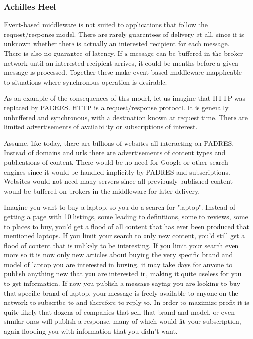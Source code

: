 \documentclass{acm_proc_article-sp}
\begin{document}

\subsubsection{Achilles Heel}
\label{sec:appsebbad}


Event-based middleware is not suited to applications that follow the request/response model. There are rarely guarantees of delivery  at all, since it is unknown whether there is actually an interested recipient for each message. There is also no guarantee of latency. If a message can be buffered in the broker network until an interested recipient arrives, it could be months before a given message is processed. Together these make event-based middleware inapplicable to situations where synchronous operation is desirable.

As an example of the consequences of this model, let us imagine that HTTP was replaced by PADRES. HTTP is a request/response protocol. It is generally unbuffered and synchronous, with a destination known at request time. There are limited advertisements of availability or subscriptions of interest.

Assume, like today, there are billions of websites all interacting on PADRES. Instead of domains and urls there are advertisements of content types and publications of content. There would be no need for Google or other search engines since it would be handled implicitly by PADRES and subscriptions. Websites would not need many servers since all previously published content would be buffered on brokers in the middleware for later delivery.

Imagine you want to buy a laptop, so you do a search for "laptop". Instead of getting a page with 10 listings, some leading to definitions, some to reviews, some to places to buy, you'd get a flood of all content that has ever been produced that mentioned laptops. If you limit your search to only new content, you'd still get a flood of content that is unlikely to be interesting. If you limit your search even more so it is now only new articles about buying the very specific brand and model of laptop you are interested in buying, it may take days for anyone to publish anything new that you are interested in, making it quite useless for you to get information. If now you publish a message saying you are looking to buy that specific brand of laptop, your message is freely available to anyone on the network to subscribe to and therefore to reply to. In order to maximize profit it is quite likely that dozens of companies that sell that brand and model, or even similar ones will publish a response, many of which would fit your subscription, again flooding you with information that you didn't want.
\end{document}
